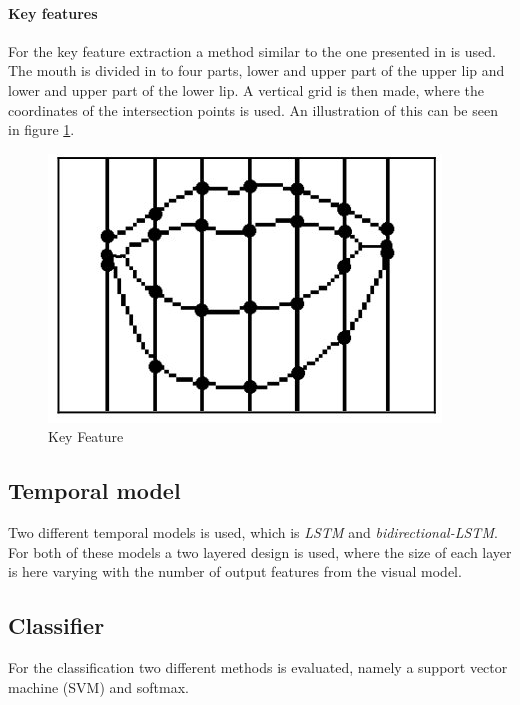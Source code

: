 \paragraph{Key features}
For the key feature extraction a method similar to the one presented in \cite{Li2008} is used.
The mouth is divided in to four parts, lower and upper part of the upper lip and lower and upper part of the lower lip.
A vertical grid is then made, where the coordinates of the intersection points is used.
An illustration of this can be seen in figure \ref{fig:keyFeature}.
\begin{figure}[h]
    \centering
    \includegraphics[width=0.5\columnwidth]{fig/keyFeature.jpg}
    \caption{Key Feature}
    \label{fig:keyFeature}
\end{figure}

\subsection{Temporal model}
Two different temporal models is used, which is \textit{LSTM} and \textit{bidirectional-LSTM}.
For both of these models a two layered design is used, where the size of each layer is here varying with the number of output features from the visual model.

\subsection{Classifier}
For the classification two different methods is evaluated, namely a support vector machine (SVM) and softmax.


